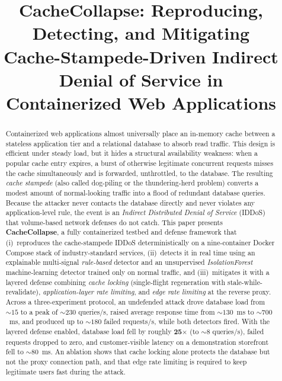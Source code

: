 \documentclass[conference]{IEEEtran}
\begin{document}
\title{CacheCollapse: Reproducing, Detecting, and Mitigating\\
Cache-Stampede-Driven Indirect Denial of Service in\\
Containerized Web Applications}

\author{
}

\maketitle

\begin{abstract}
Containerized web applications almost universally place an in-memory cache between
a stateless application tier and a relational database to absorb read traffic. This
design is efficient under steady load, but it hides a structural availability
weakness: when a popular cache entry expires, a burst of otherwise legitimate
concurrent requests misses the cache simultaneously and is forwarded, unthrottled,
to the database. The resulting \emph{cache stampede} (also called dog-piling or the
thundering-herd problem) converts a modest amount of normal-looking traffic into a
flood of redundant database queries. Because the attacker never contacts the
database directly and never violates any application-level rule, the event is an
\emph{Indirect Distributed Denial of Service} (IDDoS) that volume-based network
defenses do not catch. This paper presents \textbf{CacheCollapse}, a fully
containerized testbed and defense framework that (i)~reproduces the cache-stampede
IDDoS deterministically on a nine-container Docker Compose stack of
industry-standard services, (ii)~detects it in real time using an explainable
multi-signal \emph{rule-based} detector and an unsupervised \emph{IsolationForest}
machine-learning detector trained only on normal traffic, and (iii)~mitigates it
with a layered defense combining \emph{cache locking} (single-flight regeneration
with stale-while-revalidate), \emph{application-layer rate limiting}, and \emph{edge
rate limiting} at the reverse proxy. Across a three-experiment protocol, an
undefended attack drove database load from ${\sim}15$ to a peak of ${\sim}230$
queries/s, raised average response time from ${\sim}130$~ms to ${\sim}700$~ms, and
produced up to ${\sim}180$ failed requests/s, while both detectors fired. With the
layered defense enabled, database load fell by roughly \textbf{25$\times$} (to
${\sim}8$ queries/s), failed requests dropped to zero, and customer-visible latency
on a demonstration storefront fell to ${\sim}80$~ms. An ablation shows that cache
locking alone protects the database but not the proxy connection path, and that
edge rate limiting is required to keep legitimate users fast during the attack.
\end{abstract}
\end{document}
